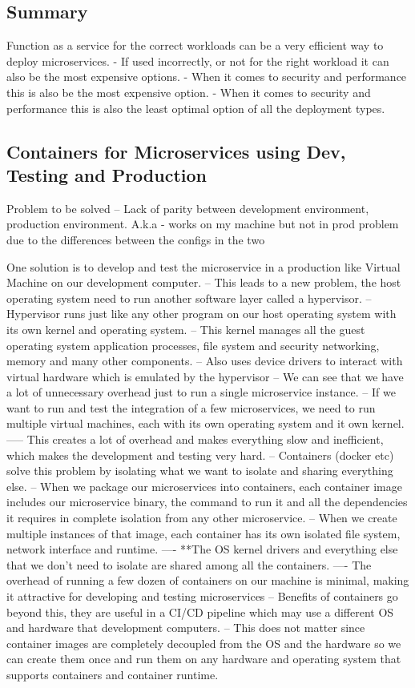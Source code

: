 \documentclass[a4paper, 11pt]{book}
\begin{document}
    \subsection{Summary}
    Function as a service for the correct workloads can be a very efficient way to deploy microservices.
    - If used incorrectly, or not for the right workload it can also be the most expensive options.
    - When it comes to security and performance this is also be the most expensive option.
    - When it comes to security and performance this is also the least optimal option of all the deployment types.

    \subsection{Containers for Microservices using Dev, Testing and Production}
    Problem to be solved -- Lack of parity between development environment, production environment.
    A.k.a - works on my machine but not in prod problem due to the differences between the configs in the two

    One solution is to develop and test the microservice in a production like Virtual Machine on our development computer.
    -- This leads to a new problem, the host operating system need to run another software layer called a hypervisor.
    -- Hypervisor runs just like any other program on our host operating system with its own kernel and operating system.
    -- This kernel manages all the guest operating system application processes, file system and security networking, memory and many other components.
    -- Also uses device drivers to interact with virtual hardware which is emulated by the hypervisor
    -- We can see that we have a lot of unnecessary overhead just to run a single microservice instance.
    -- If we want to run and test the integration of a few microservices, we need to run multiple virtual machines, each with its own operating system and it own kernel.
    ----- This creates a lot of overhead and makes everything slow and inefficient, which makes the development and testing very hard.
    -- Containers (docker etc) solve this problem by isolating what we want to isolate and sharing everything else.
    -- When we package our microservices into containers, each container image includes our microservice binary, the command to run it and all the dependencies it requires in complete isolation from any other microservice.
    -- When we create multiple instances of that image, each container has its own isolated file system, network interface and runtime.
    ---- **The OS kernel drivers and everything else that we don't need to isolate are shared among all the containers.
    ---- The overhead of running a few dozen of containers on our machine is minimal, making it attractive for developing and testing microservices
    -- Benefits of containers go beyond this, they are useful in a CI/CD pipeline which may use a different OS and hardware that development computers.
    -- This does not matter since container images are completely decoupled from the OS and the hardware so we can create them once and run them on any hardware and operating system that supports containers and container runtime.
\end{document}
